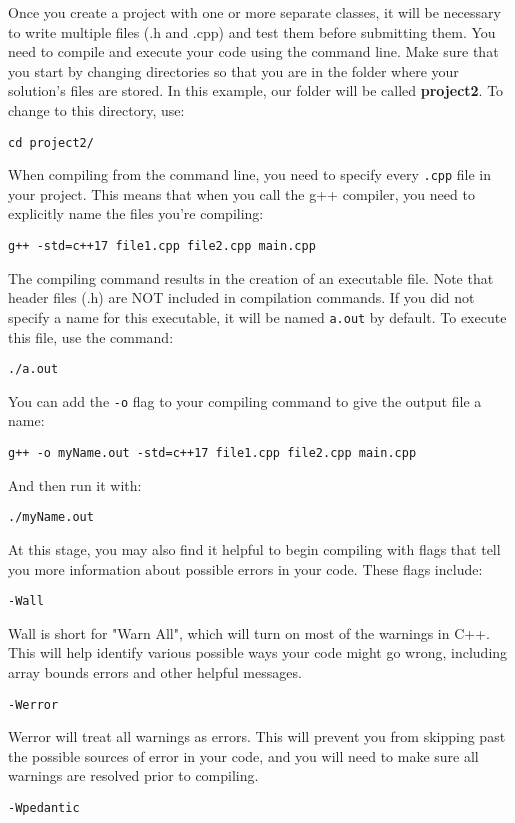 Once you create a project with one or more separate classes, it will be necessary to write multiple files (.h and .cpp) and test them before submitting them. You need to compile and execute your code using the command line. Make sure that you start by changing directories so that you are in the folder where your solution’s files are stored. In this example, our folder will be called \textbf{project2}. To change to this directory, use:

\texttt{cd project2/}

When compiling from the command line, you need to specify every \texttt{.cpp} file in your project. This means that when you call the g++ compiler, you need to explicitly name the files you’re compiling:

\texttt{g++ -std=c++17 file1.cpp file2.cpp main.cpp}

The compiling command results in the creation of an executable file. Note that header files (.h) are NOT included in compilation commands. If you did not specify a name for this executable, it will be named \texttt{a.out} by default. To execute this file, use the command:

\texttt{./a.out}

You can add the \texttt{-o} flag to your compiling command to give the output file a name:

\texttt{g++ -o myName.out -std=c++17 file1.cpp file2.cpp main.cpp}

And then run it with:

\texttt{./myName.out}

At this stage, you may also find it helpful to begin compiling with flags that tell you more information about possible errors in your code. These flags include:

\texttt{-Wall}

Wall is short for "Warn All", which will turn on most of the warnings in C++. This will help identify various possible ways your code might go wrong, including array bounds errors and other helpful messages.

\texttt{-Werror}

Werror will treat all warnings as errors. This will prevent you from skipping past the possible sources of error in your code, and you will need to make sure all warnings are resolved prior to compiling.

\texttt{-Wpedantic}

